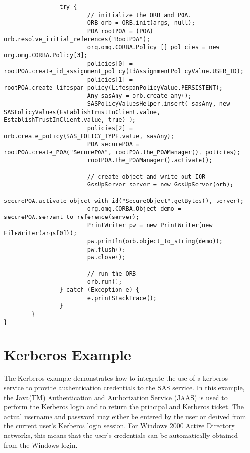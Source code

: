 \begin{scriptsize}
\begin{verbatim}
                try {
                        // initialize the ORB and POA.
                        ORB orb = ORB.init(args, null);
                        POA rootPOA = (POA) orb.resolve_initial_references("RootPOA");
                        org.omg.CORBA.Policy [] policies = new org.omg.CORBA.Policy[3];
                        policies[0] = rootPOA.create_id_assignment_policy(IdAssignmentPolicyValue.USER_ID);
                        policies[1] = rootPOA.create_lifespan_policy(LifespanPolicyValue.PERSISTENT);
                        Any sasAny = orb.create_any();
                        SASPolicyValuesHelper.insert( sasAny, new SASPolicyValues(EstablishTrustInClient.value, EstablishTrustInClient.value, true) );
                        policies[2] = orb.create_policy(SAS_POLICY_TYPE.value, sasAny);
                        POA securePOA = rootPOA.create_POA("SecurePOA", rootPOA.the_POAManager(), policies);
                        rootPOA.the_POAManager().activate();

                        // create object and write out IOR
                        GssUpServer server = new GssUpServer(orb);
                        securePOA.activate_object_with_id("SecureObject".getBytes(), server);
                        org.omg.CORBA.Object demo = securePOA.servant_to_reference(server);
                        PrintWriter pw = new PrintWriter(new FileWriter(args[0]));
                        pw.println(orb.object_to_string(demo));
                        pw.flush();
                        pw.close();

                        // run the ORB
                        orb.run();
                } catch (Exception e) {
                        e.printStackTrace();
                }
        }
}
\end{verbatim}
\end{scriptsize}

\section{Kerberos Example}

The Kerberos example demonstrates how to integrate the use of a kerberos
service to provide authentication credentials to the SAS service.
In this example, the Java(TM) Authentication and Authorization Service (JAAS)
is used to perform the Kerberos login
and to return the principal and Kerberos ticket.
The actual username and password may either be entered by the user
or derived from the current user's Kerberos login session.
For Windows 2000 Active Directory networks, this means that the user's
credentials can be automatically obtained from the Windows login.

